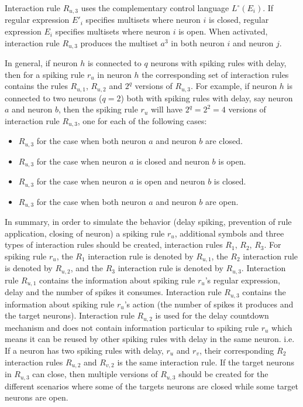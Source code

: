 \documentclass[a4paper]{article}
\theoremstyle{definition}
\begin{document}
Interaction rule $R_{u,3}$ uses the complementary control language $L^{\circ}(E_i)$. If regular
expression $E'_i$ specifies multisets where neuron $i$ is closed, regular expression $E_i$ specifies
multisets where neuron $i$ is open. When activated, interaction rule $R_{u,3}$ produces the multiset
$a^3$ in both neuron $i$ and neuron $j$.

In general, if neuron $h$ is connected to $q$ neurons with spiking rules with delay, then for a 
spiking rule $r_{u}$ in neuron $h$ the corresponding set of interaction rules contains the rules
$R_{u,1}$, $R_{u,2}$ and $2^q$ versions of $R_{u,3}$. For example, if neuron $h$ is connected to two
neurons ($q=2$) both with spiking rules with delay, say neuron $a$ and neuron $b$, then the spiking
rule $r_u$ will have $2^q = 2^2 = 4$ versions of interaction rule $R_{u,3}$, one for each of the 
following cases:

\begin{itemize}
\item $R_{u,3}$ for the case when both neuron $a$ and neuron $b$ are closed.
\item $R_{u,3}$ for the case when neuron $a$ is closed and neuron $b$ is open.
\item $R_{u,3}$ for the case when neuron $a$ is open and neuron $b$ is closed.
\item $R_{u,3}$ for the case when both neuron $a$ and neuron $b$ are open.
\end{itemize}

In summary, in order to simulate the behavior (delay spiking, prevention of rule application,
closing of neuron) a spiking rule $r_u$, additional symbols and three types of interaction rules 
should be created, interaction rules $R_1$, $R_2$, $R_3$. For spiking rule $r_u$, the $R_1$ 
interaction rule is denoted by $R_{u,1}$, the $R_2$ interaction rule is denoted by $R_{u,2}$, and
the $R_3$ interaction rule is denoted by $R_{u,3}$. Interaction rule $R_{u,1}$ contains the 
information about spiking rule $r_u$'s regular expression, delay and the number of spikes it 
consumes. Interaction rule $R_{u,3}$ contains the information about spiking rule $r_u$'s action
(the number of spikes it produces and the target neurons). Interaction rule $R_{u,2}$ is used for
the delay countdown mechanism and does not contain information particular to spiking rule $r_u$ 
which means it can be reused by other spiking rules with delay in the same neuron. i.e. If a neuron
has two spiking rules with delay, $r_u$ and $r_v$, their corresponding $R_2$ interaction rules
$R_{u,2}$ and $R_{v,2}$ is the same interaction rule. If the target neurons in $R_{u,3}$ can close,
then multiple versions of $R_{u,3}$ should be created for the different scenarios where some of the
targets neurons are closed while some target neurons are open.
\end{document}
